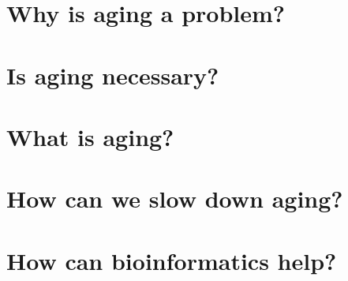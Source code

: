 \section{Why is aging a problem?}
\section{Is aging necessary?}
\section{What is aging?}
\section{How can we slow down aging?}
\section{How can bioinformatics help?}
